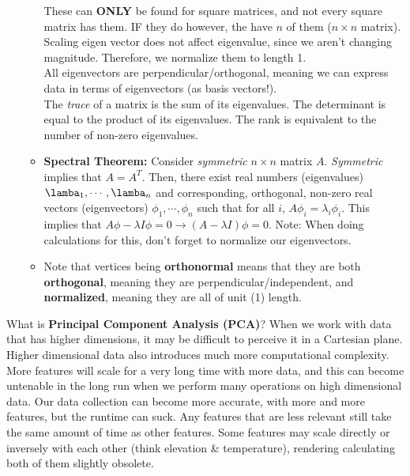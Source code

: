 \documentclass{article}
\begin{document}
\begin{itemize}
\begin{itemize}
        These can \textbf{ONLY} be found for square matrices, and not every square matrix has them. IF they do however, the have $n$ of them ($n\times n$ matrix). \\
        Scaling eigen vector does not affect eigenvalue, since we aren't changing magnitude. Therefore, we normalize them to length 1.
        \\
        All eigenvectors are perpendicular/orthogonal, meaning we can express data in terms of eigenvectors (as basis vectors!).\\
        The \textit{trace} of a matrix is the sum of its eigenvalues. The determinant is equal to the product of its eigenvalues. The rank is equivalent to the number of non-zero eigenvalues. 
        \item \textbf{Spectral Theorem:} Consider \textit{symmetric} $n \times n$ matrix $A$. \textit{Symmetric} implies that $A = A^T$. Then, there exist real numbers (eigenvalues) $\lamba_1, \cdots, \lamba_n$ and corresponding, orthogonal, non-zero real vectors (eigenvectors) $\phi_1,\cdots,\phi_n$ such that for all $i$, $A\phi_i = \lambda_i\phi_i$. This implies that $A\phi - \lambda I\phi = 0 \rightarrow (A - \lambda I)\phi = 0$. Note: When doing calculations for this, don't forget to normalize our eigenvectors. 
        \item Note that vertices being \textbf{orthonormal} means that they are both \textbf{orthogonal}, meaning they are perpendicular/independent, and \textbf{normalized}, meaning they are all of unit (1) length.
    \end{itemize}
\end{itemize}
What is \textbf{Principal Component Analysis (PCA)}? When we work with data that has higher dimensions, it may be difficult to perceive it in a Cartesian plane. Higher dimensional data also introduces much more computational complexity. More features will scale for a very long time with more data, and this can become untenable in the long run when we perform many operations on high dimensional data. Our data collection can become more accurate, with more and more features, but the runtime can suck. Any features that are less relevant still take the same amount of time as other features. Some features may scale directly or inversely with each other (think elevation & temperature), rendering calculating both of them slightly obsolete. 

\newline
\newline
\end{document}
